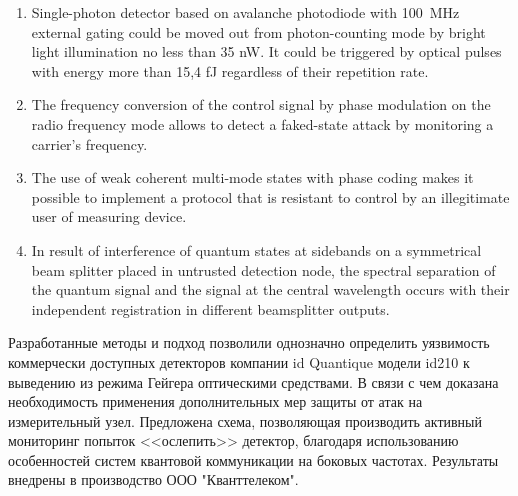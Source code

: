 {\statements}
\begin{enumerate}

  \item Single-photon detector based on avalanche photodiode with 100~MHz external gating could be moved out from photon-counting mode by bright light illumination no less than 35 nW. It could be triggered by optical pulses with energy more than 15,4 fJ regardless of their repetition rate.
  \item The frequency conversion of the control signal by phase modulation on the radio frequency mode allows to detect a faked-state attack by monitoring a carrier's frequency.
  \item The use of weak coherent multi-mode states with phase coding makes it possible to implement a protocol that is resistant to control by an illegitimate user of measuring device.
  \item In result of interference of quantum states at sidebands on a symmetrical beam splitter placed in untrusted detection node, the spectral separation of the quantum signal and the signal at the central wavelength occurs with their independent registration in different beamsplitter outputs. 
 
\end{enumerate}
{\influence} 

Разработанные методы и подход позволили однозначно определить уязвимость коммерчески доступных детекторов компании id Quantique модели id210 к выведению из режима Гейгера оптическими средствами. В связи с чем доказана необходимость применения дополнительных мер защиты от атак на измерительный узел. Предложена схема, позволяющая производить активный мониторинг попыток <<ослепить>> детектор, благодаря использованию особенностей систем квантовой коммуникации на боковых частотах. Результаты внедрены в производство ООО "Кванттелеком". 


